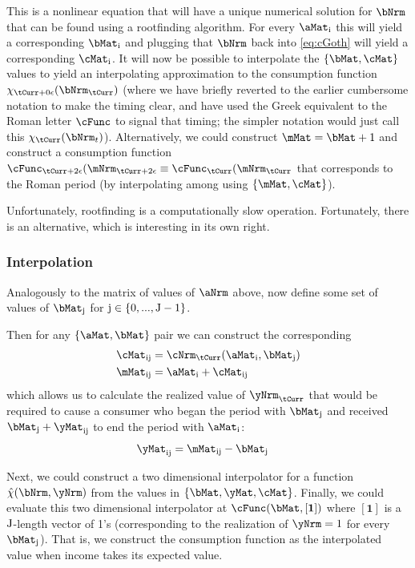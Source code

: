 \documentclass[./SolvingMicroDSOPs_TRP]{subfiles}
\begin{document}
{This is a nonlinear equation that will have a unique numerical solution for $\bNrm$ that can be found using a rootfinding algorithm.  For every $\aMat_{\aIdx}$ this will yield a corresponding $\bMat_{\aIdx}$ and plugging that $\bNrm$ back into \eqref{eq:cGoth} will yield a corresponding $\cMat_{\aIdx}$.  It will now be possible to interpolate the $\{\bMat,\cMat\}$ values to yield an interpolating approximation to the consumption function $\chi_{\tCurr+\beginWithb}(\bNrm_{\tCurr})$ (where we have briefly reverted to the earlier cumbersome notation to make the timing clear, and have used the Greek equivalent to the Roman letter $\cFunc$ to signal that timing; the simpler notation would just call this $\chi_{\tCurr}(\bNrm_{t})$).  Alternatively, we could construct $\mMat = \bMat + 1$ and construct a consumption function $\cFunc_{\tCurr+\calculatem}(\mNrm_{\tCurr+\calculatem} \equiv \cFunc_{\tCurr}(\mNrm_{\tCurr}$ that corresponds to the Roman period (by interpolating among using $\{\mMat,\cMat\}$).

Unfortunately, rootfinding is a computationally slow operation.  Fortunately, there is an alternative, which is interesting in its own right.  

\subsubsection{Interpolation}

Analogously to the matrix of values of $\aNrm$ above, now define some set of values of $\bMat_{\bIdx}$ for $\mathrm{j} \in \{0,...,\mathrm{J}-1\}$.

Then for any $\{\aMat,\bMat\}$ pair we can construct the corresponding
\begin{align}
  \cMat_{\aIdx\bIdx} & = \mathfrak{\cNrm}_{\tCurr}(\aMat_{\aIdx},\bMat_{\bIdx})
\\ \mMat_{\aIdx\bIdx} & = \aMat_{\aIdx}+\cMat_{\aIdx\bIdx}                       
\end{align}
which allows us to calculate the realized value of $\yNrm_{\tCurr}$ that would be required to cause a consumer who began the period with $\bMat_{\bIdx}$ and received $\bMat_{\bIdx}+\yMat_{\aIdx\bIdx}$ to end the period with $\aMat_{\aIdx}$:
\begin{align}
  \yMat_{\aIdx\bIdx} & = \mMat_{\aIdx\bIdx}-\bMat_{\bIdx}
\end{align}

Next, we could construct a two dimensional interpolator for a function $\hat{\chi}(\bNrm,\yNrm)$ from the values in $\{\bMat,\yMat,\cMat\}$.  Finally, we could evaluate this two dimensional interpolator at $\cFunc(\bMat,[\mathbf{1}])$ where $[\mathbf{1}]$ is a $\mathrm{J}$-length vector of 1's (corresponding to the realization of $\yNrm=1$ for every $\bMat_{\bIdx}$).  That is, we construct the consumption function as the interpolated value when income takes its expected value.

}
\end{document}
